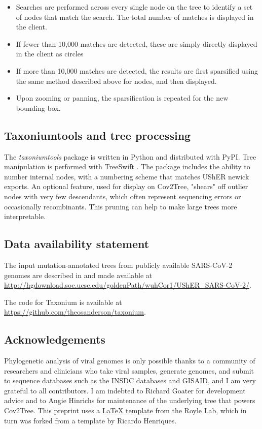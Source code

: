 \begin{itemize}
   
\item Searches are performed across every single node on the tree to identify a set of nodes that match the search. The total number of matches is displayed in the client.
\item If fewer than 10,000 matches are detected, these are simply directly displayed in the client as circles
\item If more than 10,000 matches are detected, the results are first sparsified using the same method described above for nodes, and then displayed. 
\item Upon zooming or panning, the sparsification is repeated for the new bounding box.
\end{itemize}



\subsection*{Taxoniumtools and tree processing}
The \emph{taxoniumtools} package is written in Python and distributed with PyPI. Tree manipulation is performed with TreeSwift \citep{moshiri2020treeswift}. The package includes the ability to number internal nodes, with a numbering scheme that matches UShER newick exports. An optional feature, used for display on Cov2Tree, "shears" off outlier nodes with very few descendants, which often represent sequencing errors or occasionally recombinants. This pruning can help to make large trees more interpretable.


\small

\subsection*{Data availability statement}

The input mutation-annotated trees from publicly available SARS-CoV-2 genomes are described in \cite{McBroome2021} and made available at \url{http://hgdownload.soe.ucsc.edu/goldenPath/wuhCor1/UShER_SARS-CoV-2/}.

The code for Taxonium is available at \url{https://github.com/theosanderson/taxonium}.


\subsection*{Acknowledgements}

Phylogenetic analysis of viral genomes is only possible thanks to a community of researchers and clinicians who take viral samples, generate genomes, and submit to sequence databases such as the INSDC databases and GISAID, and I am very grateful to all contributors. I am indebted to Richard Goater for development advice and to Angie Hinrichs for maintenance of the underlying tree that powers Cov2Tree. This preprint uses a \href{https://github.com/roylelab/manuscript-templates}{LaTeX template} from the Royle Lab, which in turn was forked from a template by Ricardo Henriques.

